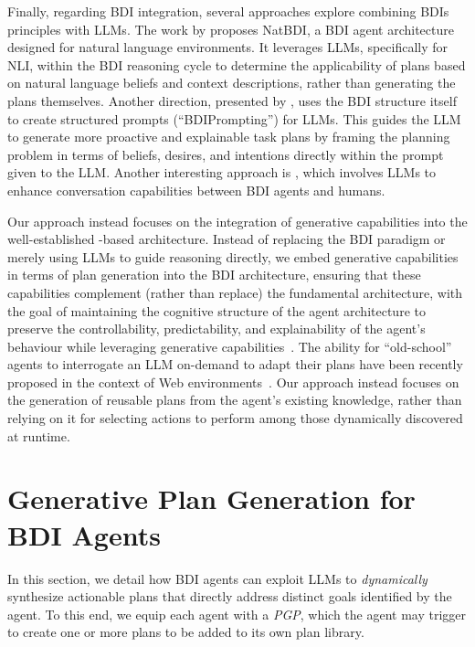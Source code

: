 Finally,
regarding \ac{BDI} integration,
several approaches explore combining \acp{BDI} principles with \acp{LLM}.
%
The work by \cite{IchidaM024} proposes NatBDI,
a \ac{BDI} agent architecture designed for natural language environments.
%
It leverages \acp{LLM},
specifically for \ac{NLI},
within the \ac{BDI} reasoning cycle to determine the applicability of plans based on natural language beliefs and context descriptions,
rather than generating the plans themselves.
%
Another direction, presented by \cite{JangYCO023},
uses the \ac{BDI} structure itself to create structured prompts (``BDIPrompting'') for \acp{LLM}.
%
This guides the \ac{LLM} to generate more proactive and explainable task plans
by framing the planning problem in terms of beliefs, desires, and intentions
directly within the prompt given to the \ac{LLM}.
%
Another interesting approach is \cite{2025chatbdi},
which involves \acp{LLM} to enhance conversation capabilities between \ac{BDI} agents and humans.

Our approach instead focuses on the integration of generative capabilities
into the well-established \agentspeak{}-based architecture.
%
Instead of replacing the \ac{BDI} paradigm or merely using \acp{LLM} to guide reasoning directly,
we embed generative capabilities in terms of plan generation
into the \ac{BDI} architecture,
ensuring that these capabilities complement
(rather than replace)
the fundamental \agentspeak{} architecture,
with the goal of maintaining the cognitive structure of the agent architecture
to preserve the controllability, predictability, and explainability of the agent's behaviour
while leveraging generative capabilities~\cite{ricci2024atal}.
%
The ability for ``old-school'' agents to interrogate an \ac{LLM} on-demand
to adapt their plans
have been recently proposed in the context of Web environments~\cite{schmid2024kgswc}.
%
Our approach instead
focuses on the generation of reusable plans from the agent's existing knowledge,
rather than relying on it for selecting actions to perform among those dynamically discovered at runtime.

\section{Generative Plan Generation for \acs{BDI} Agents}
\label{sec:pgp}

In this section,
we detail how \ac{BDI} agents can exploit \acp{LLM} to \emph{dynamically} synthesize actionable plans
that directly address distinct goals identified by the agent.
%
To this end,
we equip each agent with a \emph{\acf{PGP}},
which the agent may trigger to create one or more plans to be added to its own plan library.

